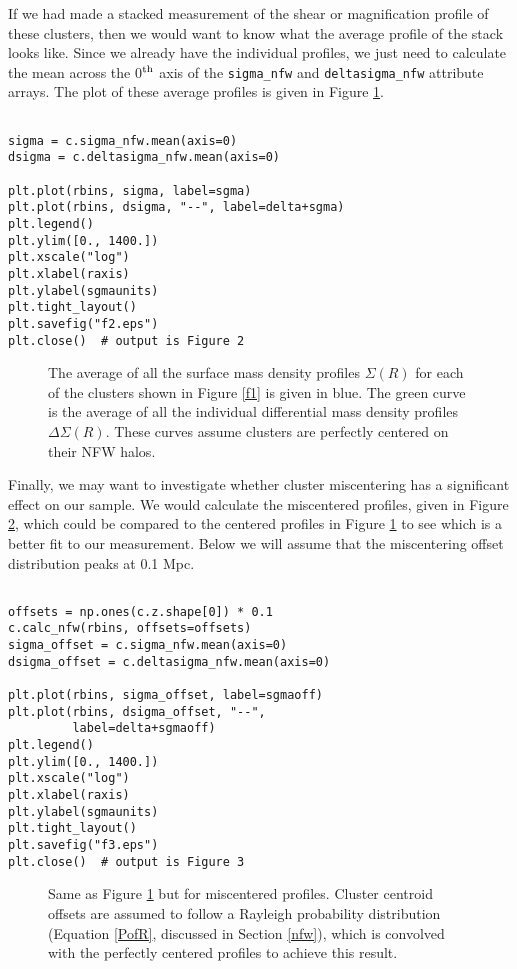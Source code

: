 \documentclass[twocolumn]{aastex6}
\newcommand{\code}{\lstinline[style=codeintext]}
\begin{document}
If we had made a stacked measurement of the shear or magnification profile of these clusters, then we would want to know what the average profile of the stack looks like. Since we already have the individual profiles, we just need to calculate the mean across the 0$^{\rm th}$ axis of the \code{sigma_nfw} and \code{deltasigma_nfw} attribute arrays. The plot of these average profiles is given in Figure \ref{f2}.

\begin{lstlisting}

sigma = c.sigma_nfw.mean(axis=0)
dsigma = c.deltasigma_nfw.mean(axis=0)

plt.plot(rbins, sigma, label=sgma)
plt.plot(rbins, dsigma, "--", label=delta+sgma)
plt.legend()
plt.ylim([0., 1400.])
plt.xscale("log")
plt.xlabel(raxis)
plt.ylabel(sgmaunits)
plt.tight_layout()
plt.savefig("f2.eps")
plt.close()  # output is Figure 2

\end{lstlisting}

\begin{figure}
\caption{The average of all the surface mass density profiles $\Sigma(R)$ for each of the clusters shown in Figure \ref{f1} is given in blue. The green curve is the average of all the individual differential mass density profiles $\Delta\Sigma(R)$. These curves assume clusters are perfectly centered on their NFW halos.}
\label{f2}
\end{figure}

Finally, we may want to investigate whether cluster miscentering has a significant effect on our sample. We would calculate the miscentered profiles, given in Figure \ref{f3}, which could be compared to the centered profiles in Figure \ref{f2} to see which is a better fit to our measurement. Below we will assume that the miscentering offset distribution peaks at 0.1 Mpc.

\begin{lstlisting}

offsets = np.ones(c.z.shape[0]) * 0.1
c.calc_nfw(rbins, offsets=offsets)
sigma_offset = c.sigma_nfw.mean(axis=0)
dsigma_offset = c.deltasigma_nfw.mean(axis=0)

plt.plot(rbins, sigma_offset, label=sgmaoff)
plt.plot(rbins, dsigma_offset, "--", 
         label=delta+sgmaoff)
plt.legend()
plt.ylim([0., 1400.])
plt.xscale("log")
plt.xlabel(raxis)
plt.ylabel(sgmaunits)
plt.tight_layout()
plt.savefig("f3.eps")
plt.close()  # output is Figure 3

\end{lstlisting}
\begin{figure}
\caption{Same as Figure \ref{f2} but for miscentered profiles. Cluster centroid offsets are assumed to follow a Rayleigh probability distribution (Equation \ref{PofR}, discussed in Section \ref{nfw}), which is convolved with the perfectly centered profiles to achieve this result.}
\label{f3}
\end{figure}
\end{document}
